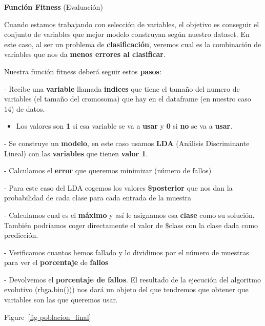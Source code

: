 \documentclass[
  a4paper,
  DIV=11,
  numbers=noendperiod]{scrreprt}
\providecommand{\tightlist}{%
  \setlength{\itemsep}{0pt}\setlength{\parskip}{0pt}}\usepackage{longtable,booktabs,array}
\begin{document}
\textbf{Función Fitness} (Evaluación)

Cuando estamos trabajando con selección de variables, el objetivo es
conseguir el conjunto de variables que mejor modelo construyan según
nuestro dataset. En este caso, al ser un problema de
\textbf{clasificación}, veremos cual es la combinación de variables que
nos da \textbf{menos errores al clasificar}.

Nuestra función fitness deberá seguir estos \textbf{pasos}:

- Recibe una \textbf{variable} llamada \textbf{indices} que tiene el
tamaño del numero de variables (el tamaño del cromosoma) que hay en el
dataframe (en nuestro caso 14) de datos.

\begin{itemize}
\tightlist
\item
  Los valores son \textbf{1} si esa variable se va a \textbf{usar} y
  \textbf{0} si \textbf{no} se va a \textbf{usar}.
\end{itemize}

- Se construye un \textbf{modelo}, en este caso usamos \textbf{LDA}
(Análisis Discriminante Lineal) con las \textbf{variables} que tienen
\textbf{valor 1}.

- Calculamos el \textbf{error} que queremos minimizar (número de fallos)

- Para este caso del LDA cogemos los valores \textbf{\$posterior} que
nos dan la probabilidad de cada clase para cada entrada de la muestra

- Calculamos cual es el \textbf{máximo} y así le asignamos esa
\textbf{clase} como su solución. También podríamos coger directamente el
valor de \$class con la clase dada como predicción.

- Verificamos cuantos hemos fallado y lo dividimos por el número de
muestras para ver el \textbf{porcentaje} de \textbf{fallos}

- Devolvemos el \textbf{porcentaje de fallos}. El resultado de la
ejecución del algoritmo evolutivo (rbga.bin())) nos dará un objeto del
que tendremos que obtener que variables son las que queremos usar.

Figure~\ref{fig-poblacion_final}
\end{document}
